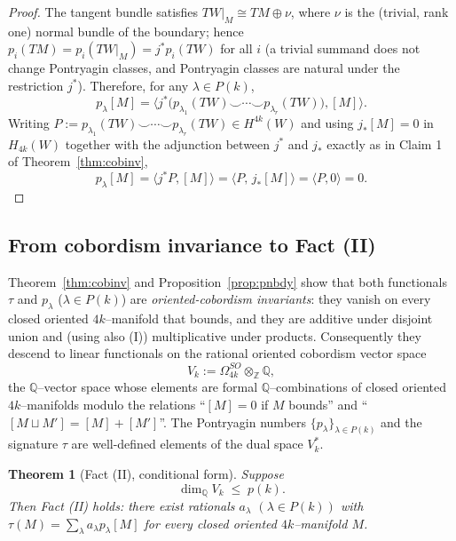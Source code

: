 \documentclass[12pt]{article}
\newtheorem{theorem}{Theorem}
\theoremstyle{definition}
\begin{document}
\begin{proof}
The tangent bundle satisfies $TW|_M\cong TM\oplus\nu$, where $\nu$ is the (trivial, rank
one) normal bundle of the boundary; hence $p_i(TM)=p_i(TW|_M)=j^\ast p_i(TW)$ for all $i$
(a trivial summand does not change Pontryagin classes, and Pontryagin classes are natural
under the restriction $j^\ast$).  Therefore, for any $\lambda\in P(k)$,
\[
p_\lambda[M]=\big\langle j^\ast\!\big(p_{\lambda_1}(TW)\smile\cdots\smile
p_{\lambda_r}(TW)\big),[M]\big\rangle .
\]
Writing $P:=p_{\lambda_1}(TW)\smile\cdots\smile p_{\lambda_r}(TW)\in H^{4k}(W)$ and using
$j_\ast[M]=0$ in $H_{4k}(W)$ together with the adjunction between $j^\ast$ and $j_\ast$
exactly as in Claim 1 of Theorem~\ref{thm:cobinv},
\[
p_\lambda[M]=\big\langle j^\ast P,[M]\big\rangle
=\big\langle P,\,j_\ast[M]\big\rangle=\big\langle P,0\big\rangle=0 .
\]
\end{proof}

\subsection*{From cobordism invariance to Fact (II)}

Theorem~\ref{thm:cobinv} and Proposition~\ref{prop:pnbdy} show that both functionals
$\tau$ and $p_\lambda$ ($\lambda\in P(k)$) are \emph{oriented-cobordism invariants}: they
vanish on every closed oriented $4k$--manifold that bounds, and they are additive under
disjoint union and (using also (I)) multiplicative under products.  Consequently they
descend to linear functionals on the rational oriented cobordism vector space
\[
V_k:=\Omega^{SO}_{4k}\otimes_{\mathbb Z}\mathbb Q ,
\]
the $\mathbb Q$--vector space whose elements are formal $\mathbb Q$--combinations of
closed oriented $4k$--manifolds modulo the relations ``$[M]=0$ if $M$ bounds'' and
``$[M\sqcup M']=[M]+[M']$''.  The Pontryagin numbers $\{p_\lambda\}_{\lambda\in P(k)}$ and
the signature $\tau$ are well-defined elements of the dual space $V_k^\ast$.

\begin{theorem}[Fact (II), conditional form]\label{thm:factII}
Suppose
\[
\dim_{\mathbb Q}V_k\;\le\;p(k).
\tag{$\sharp$}\label{eq:dimbound}
\]
Then Fact \textnormal{(II)} holds: there exist rationals $a_\lambda$
$(\lambda\in P(k))$ with $\tau(M)=\sum_\lambda a_\lambda p_\lambda[M]$ for every closed
oriented $4k$--manifold $M$.
\end{theorem}
\end{document}

